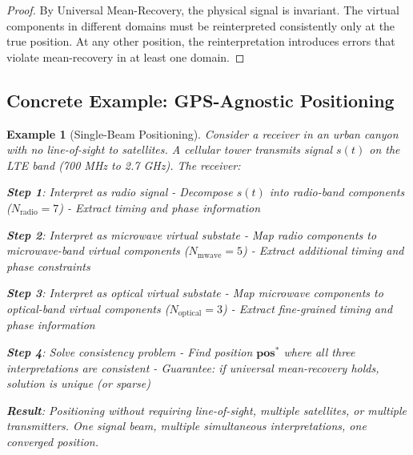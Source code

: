 \documentclass[twocolumn,11pt,a4paper]{article}
\newtheorem{example}[theorem]{Example}
\newcommand{\signal}{s}
\begin{document}
\begin{proof}
By Universal Mean-Recovery, the physical signal is invariant. The virtual components in different domains must be reinterpreted consistently only at the true position. At any other position, the reinterpretation introduces errors that violate mean-recovery in at least one domain.
\end{proof}

\subsection{Concrete Example: GPS-Agnostic Positioning}

\begin{example}[Single-Beam Positioning]
Consider a receiver in an urban canyon with no line-of-sight to satellites. A cellular tower transmits signal $\signal(t)$ on the LTE band (700 MHz to 2.7 GHz). The receiver:

\textbf{Step 1}: Interpret as radio signal
- Decompose $\signal(t)$ into radio-band components ($N_{\text{radio}} = 7$)
- Extract timing and phase information

\textbf{Step 2}: Interpret as microwave virtual substate
- Map radio components to microwave-band virtual components ($N_{\text{mwave}} = 5$)
- Extract additional timing and phase constraints

\textbf{Step 3}: Interpret as optical virtual substate
- Map microwave components to optical-band virtual components ($N_{\text{optical}} = 3$)
- Extract fine-grained timing and phase information

\textbf{Step 4}: Solve consistency problem
- Find position $\mathbf{pos}^*$ where all three interpretations are consistent
- Guarantee: if universal mean-recovery holds, solution is unique (or sparse)

\textbf{Result}: Positioning without requiring line-of-sight, multiple satellites, or multiple transmitters. One signal beam, multiple simultaneous interpretations, one converged position.
\end{example}
\end{document}
